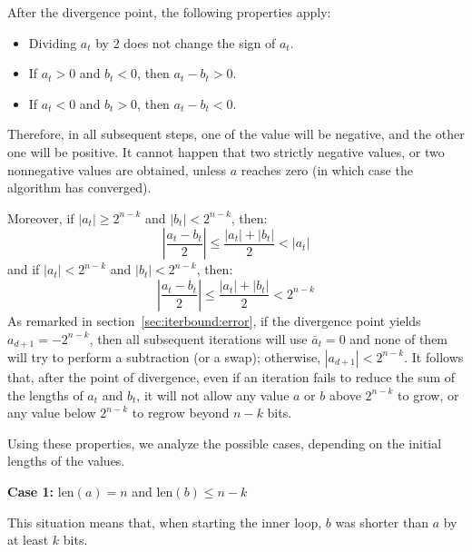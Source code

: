 \documentclass{llncs}
\newcommand{\bitlength}{\text{len}}
\begin{document}
After the divergence point, the following properties apply:
\begin{itemize}

    \item Dividing $a_t$ by 2 does not change the sign of $a_t$.

    \item If $a_t > 0$ and $b_t < 0$, then $a_t - b_t > 0$.

    \item If $a_t < 0$ and $b_t > 0$, then $a_t - b_t < 0$.

\end{itemize}
Therefore, in all subsequent steps, one of the value will be negative,
and the other one will be positive. It cannot happen that two strictly
negative values, or two nonnegative values are obtained, unless $a$
reaches zero (in which case the algorithm has converged).

Moreover, if $|a_t| \geq 2^{n-k}$ and $|b_t| < 2^{n-k}$, then:
\begin{equation*}
    \left| \frac{a_t - b_t}{2} \right| \leq \frac{|a_t| + |b_t|}{2} < |a_t|
\end{equation*}
and if $|a_t| < 2^{n-k}$ and $|b_t| < 2^{n-k}$, then:
\begin{equation*}
    \left| \frac{a_t - b_t}{2} \right| \leq \frac{|a_t| + |b_t|}{2} < 2^{n-k}
\end{equation*}
As remarked in section~\ref{sec:iterbound:error}, if the divergence
point yields $a_{d+1} = -2^{n-k}$, then all subsequent iterations will
use $\bar a_t = 0$ and none of them will try to perform a subtraction
(or a swap); otherwise, $|a_{d+1}| < 2^{n-k}$. It follows that, after
the point of divergence, even if an iteration fails to reduce the sum
of the lengths of $a_t$ and $b_t$, it will not allow any value $a$ or
$b$ above $2^{n-k}$ to grow, or any value below $2^{n-k}$ to regrow
beyond $n-k$ bits.

Using these properties, we analyze the possible cases, depending
on the initial lengths of the values.

\vspace{2ex}
\noindent\textsf{\textbf{Case 1:}} $\bitlength(a) = n$ and
$\bitlength(b) \leq n-k$

This situation means that, when starting the inner loop, $b$ was shorter
than $a$ by at least $k$ bits.
\end{document}
